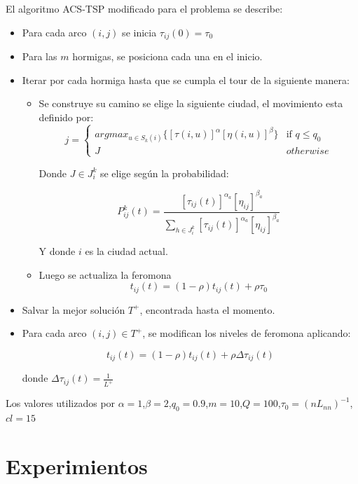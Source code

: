 \documentclass[letter, 10pt]{article}
\begin{document}
El algoritmo ACS-TSP modificado para el problema se describe:
\begin{itemize}
	\item Para cada arco $(i,j)$ se inicia $\tau_{ij}(0) = \tau_0$
	\item Para las $m$ hormigas, se posiciona cada una en el inicio.
	\item Iterar por cada hormiga hasta que se cumpla el tour de la siguiente manera:
	\begin{itemize}
	\item Se construye su camino se elige la siguiente ciudad, el movimiento esta definido por:
\begin{equation}
j = \begin{cases} arg max_{u \in S_{k}(i)} \{ [\tau(i,u)]^\alpha [\eta(i,u)]^\beta\} &\mbox{if } q \leq q_0 \\ 
J & otherwise \end{cases} 
\end{equation}

Donde $J \in J_i^k$ se elige según la probabilidad:

	\begin{equation}
		P_{ij}^k(t) = \frac{[\tau_{ij}(t)]^{\alpha_a}[\eta_{ij}]^{\beta_a}}{\sum_{h \in J_i^k } [\tau_{ij}(t)]^{\alpha_a}[\eta_{ij}]^{\beta_a}}
	\end{equation}
	
Y donde $i$ es la ciudad actual.
\item Luego se actualiza la feromona
\begin{equation}
	t_{ij}(t) = (1-\rho)t_{ij}(t) + \rho \tau_0
\end{equation}

	\end{itemize}

\item Salvar la mejor solución $T^+$, encontrada hasta el momento.
\item Para cada arco $(i,j) \in T^+$, se modifican los niveles de feromona aplicando:

\begin{equation}
	t_{ij}(t) = (1-\rho)t_{ij}(t) + \rho \Delta \tau_{ij}(t)
\end{equation}

donde $\Delta \tau_{ij}(t) = \frac{1}{L^+}$
\end{itemize} 
Los valores utilizados por $\alpha=1$,$\beta=2$,$q_0=0.9$,$m=10$,$Q=100$,$\tau_0=(nL_{nn})^{-1}$,$cl=15$
\section{Experimientos}
\end{document}
